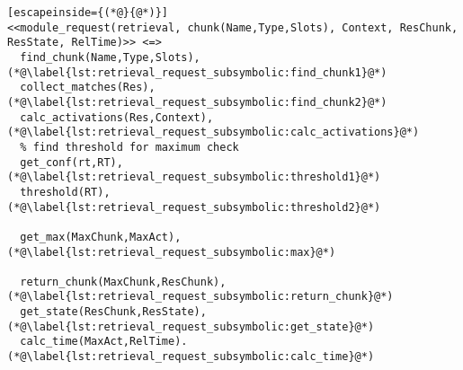 \begin{lstlisting}[escapeinside={(*@}{@*)}]
<<module_request(retrieval, chunk(Name,Type,Slots), Context, ResChunk, ResState, RelTime)>> <=> 
  find_chunk(Name,Type,Slots), (*@\label{lst:retrieval_request_subsymbolic:find_chunk1}@*)
  collect_matches(Res), (*@\label{lst:retrieval_request_subsymbolic:find_chunk2}@*)
  calc_activations(Res,Context), (*@\label{lst:retrieval_request_subsymbolic:calc_activations}@*)
  % find threshold for maximum check
  get_conf(rt,RT), (*@\label{lst:retrieval_request_subsymbolic:threshold1}@*)
  threshold(RT), (*@\label{lst:retrieval_request_subsymbolic:threshold2}@*)
  
  get_max(MaxChunk,MaxAct), (*@\label{lst:retrieval_request_subsymbolic:max}@*)
  
  return_chunk(MaxChunk,ResChunk), (*@\label{lst:retrieval_request_subsymbolic:return_chunk}@*)
  get_state(ResChunk,ResState), (*@\label{lst:retrieval_request_subsymbolic:get_state}@*)
  calc_time(MaxAct,RelTime). (*@\label{lst:retrieval_request_subsymbolic:calc_time}@*)
\end{lstlisting}

